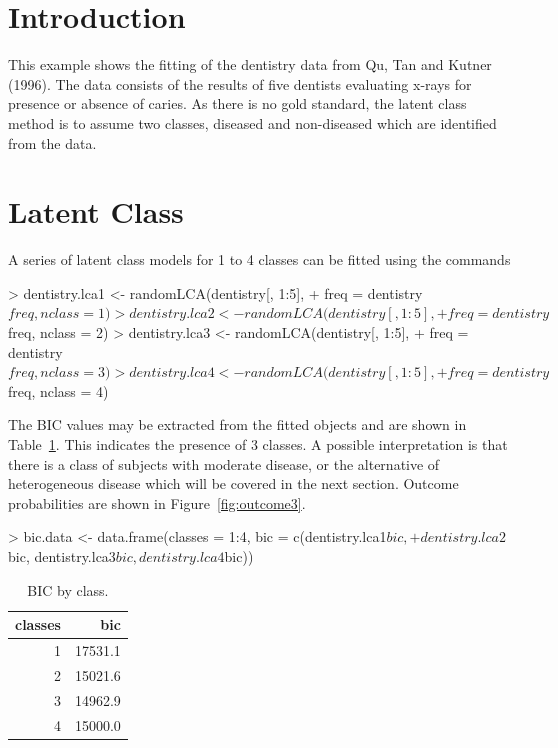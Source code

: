 \documentclass[a4paper]{article}
\begin{document}
\section{Introduction}

This example shows the fitting of the dentistry data from Qu, Tan and Kutner (1996). The data consists of the results of five dentists evaluating x-rays for presence or absence of caries. As there is no gold standard, the latent class method is to assume two classes, diseased and non-diseased which are identified from the data.

\section{Latent Class}

A series of latent class models for 1 to 4 classes can be fitted using the commands
\begin{Schunk}
\begin{Sinput}
> dentistry.lca1 <- randomLCA(dentistry[, 1:5], 
+     freq = dentistry$freq, nclass = 1)
> dentistry.lca2 <- randomLCA(dentistry[, 1:5], 
+     freq = dentistry$freq, nclass = 2)
> dentistry.lca3 <- randomLCA(dentistry[, 1:5], 
+     freq = dentistry$freq, nclass = 3)
> dentistry.lca4 <- randomLCA(dentistry[, 1:5], 
+     freq = dentistry$freq, nclass = 4)
\end{Sinput}
\end{Schunk}

The BIC values may be extracted from the fitted objects and are shown in Table~\ref{tab:bic}. This indicates the presence of 3 classes. A possible interpretation is that there is a class of subjects with moderate disease, or the alternative of heterogeneous disease which will be covered in the next section. Outcome probabilities are shown in Figure~\ref{fig:outcome3}.

\begin{Schunk}
\begin{Sinput}
> bic.data <- data.frame(classes = 1:4, bic = c(dentistry.lca1$bic, 
+     dentistry.lca2$bic, dentistry.lca3$bic, dentistry.lca4$bic))
\end{Sinput}
\end{Schunk}




\begin{table}[ht]
\begin{center}
\begin{tabular}{rr}
  \hline
classes & bic \\
  \hline
1 & 17531.1 \\
  2 & 15021.6 \\
  3 & 14962.9 \\
  4 & 15000.0 \\
   \hline
\end{tabular}
\caption{BIC by class.}
\label{tab:bic}
\end{center}
\end{table}
\end{document}
